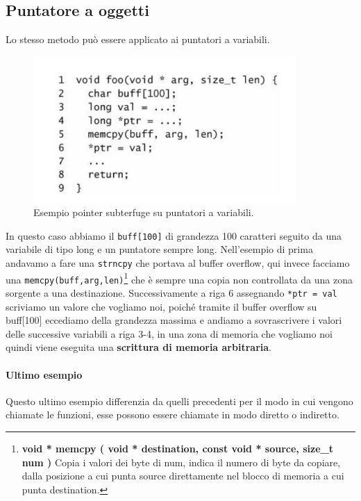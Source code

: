 \subsection{Puntatore a oggetti}

Lo stesso metodo può essere applicato ai puntatori a variabili.

\begin{figure}[H]
	\centering
	\includegraphics[width=10cm, keepaspectratio]{capitoli/secure_coding/img/cap_5/es_pointer_var.png}
	\caption{Esempio pointer subterfuge su puntatori a variabili.}\label{fig:es_poin_var}
\end{figure}

In questo caso abbiamo il \verb|buff[100]| di grandezza 100 caratteri seguito da
una variabile di tipo long e un puntatore sempre long. Nell'esempio di prima andavamo a
fare una \verb|strncpy| che portava al buffer overflow, qui invece facciamo
una \verb|memcpy(buff,arg,len)|\footnote{\textbf{void * memcpy ( void * destination,
		const void * source, size\_t num )}  Copia i valori dei byte di num, indica il numero di
	byte da copiare, dalla posizione a cui punta source direttamente nel blocco di memoria
	a cui punta destination.} che è sempre una copia non controllata da una zona sorgente
a una destinazione. Successivamente a riga 6 assegnando \verb|*ptr = val| scriviamo
un valore che vogliamo noi, poiché tramite il buffer overflow su buff[100] eccediamo
della grandezza massima e andiamo a sovrascrivere i valori delle successive variabili
a riga 3-4, in una zona di memoria che vogliamo noi quindi viene eseguita
una \textbf{scrittura di memoria arbitraria}.

\paragraph{Ultimo esempio}
Questo ultimo esempio differenzia da quelli precedenti per il modo in cui vengono
chiamate le funzioni, esse possono essere chiamate in modo diretto o indiretto.

